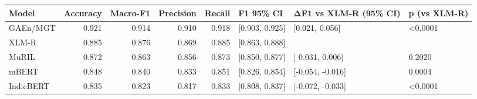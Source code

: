 \begin{tabular}{lrrrrlll}
\toprule
Model & Accuracy & Macro-F1 & Precision & Recall & F1 95\% CI & ΔF1 vs XLM-R (95\% CI) & p (vs XLM-R) \\
\midrule
GAEn/MGT & 0.921 & 0.914 & 0.910 & 0.918 & [0.903, 0.925] & [0.021, 0.056] & <0.0001 \\
XLM-R & 0.885 & 0.876 & 0.869 & 0.885 & [0.863, 0.888] &  &  \\
MuRIL & 0.872 & 0.863 & 0.856 & 0.873 & [0.850, 0.877] & [-0.031, 0.006] & 0.2020 \\
mBERT & 0.848 & 0.840 & 0.833 & 0.851 & [0.826, 0.854] & [-0.054, -0.016] & 0.0004 \\
IndicBERT & 0.835 & 0.823 & 0.817 & 0.833 & [0.808, 0.837] & [-0.072, -0.033] & <0.0001 \\
\bottomrule
\end{tabular}
